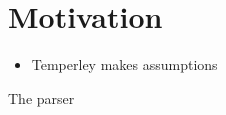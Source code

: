 \section{Motivation}
\label{sec:motivation}

\begin{itemize}
\item Temperley makes assumptions
\end{itemize}

The parser
